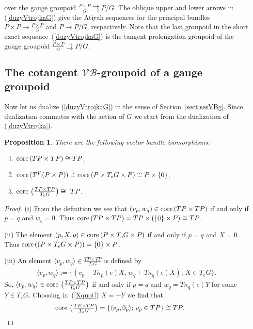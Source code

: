 \documentclass[pdftex]{sigma}
\renewcommand{\to}{\rightarrow}
\newcommand{\tto}{\rightrightarrows}
\DeclareMathOperator{\core}{\text{\upshape core}\,}
\numberwithin{equation}{section}
\newtheorem{Proposition}[Theorem]{Proposition}
 { \theoremstyle{definition}
\newtheorem{Definition}[Theorem]{Definition}
\newtheorem{Example}[Theorem]{Example}
\newtheorem{Remark}[Theorem]{Remark} }
\begin{document}
over the gauge groupoid $\frac{P\times P}{G}\tto {P}/{G}$. The oblique upper and lower arrows in (\ref{duzyVtrojkaG}) give the Atiyah sequences for the principal bundles $P\times P\to \frac{P\times P}{G}$ and $P\to { P}/{G}$, respectively. Note that the last groupoid in the short exact sequence~(\ref{duzyVtrojkaG}) is the tangent prolongation groupoid of the gauge groupoid $\frac{P\times P}{G}\tto P/G$.

\subsection[The cotangent $\mathcal{V}\!\mathcal{B}$-groupoid of a gauge groupoid]{The cotangent $\boldsymbol{\mathcal{V}\!\mathcal{B}}$-groupoid of a gauge groupoid}\label{sec:cotangauge}

Now let us dualize (\ref{duzyVtrojkaG}) in the sense of Section~\ref{sect:sesVBg}. Since dualization commutes with the action of $G$ we start from the dualization of (\ref{duzyVtrojka}).

\begin{Proposition}\label{prop18} There are the following vector bundle isomorphisms:
\begin{enumerate}\itemsep=0pt
\item[$(i)$] $\core( TP\times TP)\cong TP $,
\item[$(ii)$] $\core (T^V(P\times P))\cong \core (P\times T_eG\times P)\cong P\times\{0\}$,
\item[$(iii)$] $\core\big(\frac{TP\times TP}{T_eG}\big)\cong \ TP$.
\end{enumerate}
\end{Proposition}

\begin{proof}
(i) From the def\/inition we see that $(v_p,w_q)\in \core( TP\times TP)$ if and only if $p=q$ and $w_q=0$. Thus $\core( TP\times TP)=TP\times(\{0\}\times P)\cong TP$.

(ii) The element $(p,X,q)\in \core (P\times T_eG\times P)$ if and only if $p=q$ and $X=0$. Thus
$\core((P\times T_eG\times P))=\{0\}\times P$.

(iii) An element $\langle v_p,w_q\rangle\in \frac{TP\times T P}{T_eG}$ is def\/ined by
\begin{gather}\label{Xquot}
\langle v_p,w_q\rangle:=\{(v_p+T\kappa_p(e)X,\, w_q+T\kappa_q(e)X);\, X\in T_eG\}.
\end{gather}
So, $\langle v_p,w_q\rangle\in \core\big(\frac{TP\times T P}{T_eG}\big)$ if and only if $p=q$ and $w_q=T\kappa_q(e)Y$ for some $Y\in T_eG$. Choosing in~(\ref{Xquot}) $X=-Y$ we f\/ind that
\begin{gather*}
\core\big(\tfrac{TP\times T P}{T_eG}\big)=\{\langle v_p,0_p\rangle;\, v_p\in TP\}\cong TP.\tag*{\qed}
\end{gather*}\renewcommand{\qed}{}
\end{proof}
\end{document}
